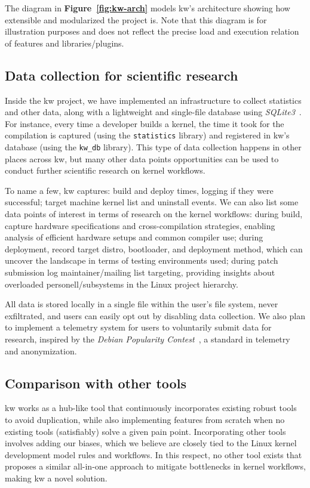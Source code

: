 The diagram in \textbf{Figure~\ref{fig:kw-arch}} models kw's architecture
showing how extensible and modularized the project is. Note that this diagram is
for illustration purposes and does not reflect the precise load and execution
relation of features and libraries/plugins.

\subsection{Data collection for scientific research}

Inside the kw project, we have implemented an infrastructure to collect
statistics and other data, along with a lightweight and single-file database
using \textit{SQLite3}~\cite{sqlite}. For instance, every time a developer builds
a kernel, the time it took for the compilation is captured (using the
\texttt{statistics} library) and registered in kw's database (using the
\texttt{kw\_db} library). This type of data collection happens in other places
across kw, but many other data points opportunities can be used to conduct
further scientific research on kernel workflows.

To name a few, kw captures: build and deploy times, logging if they were
successful; target machine kernel list and uninstall events. We can also list
some data points of interest in terms of research on the kernel workflows:
during build, capture hardware specifications and cross-compilation strategies,
enabling analysis of efficient hardware setups and common compiler use; during
deployment, record target distro, bootloader, and deployment method, which can
uncover the landscape in terms of testing environments used; during patch
submission log maintainer/mailing list targeting, providing insights about
overloaded personell/subsystems in the Linux project hierarchy.

All data is stored locally in a single file within the user's file system, never
exfiltrated, and users can easily opt out by disabling data collection. We also
plan to implement a telemetry system for users to voluntarily submit data for
research, inspired by the \textit{Debian Popularity
Contest}~\cite{debian-popcon}, a standard in telemetry and anonymization.

\subsection{Comparison with other tools}

kw works as a hub-like tool that continuously incorporates existing robust tools
to avoid duplication, while also implementing features from scratch when no
existing tools (satisfiably) solve a given pain point. Incorporating other tools
involves adding our biases, which we believe are closely tied to the Linux
kernel development model rules and workflows. In this respect, no other tool
exists that proposes a similar all-in-one approach to mitigate bottlenecks in
kernel workflows, making kw a novel solution.

